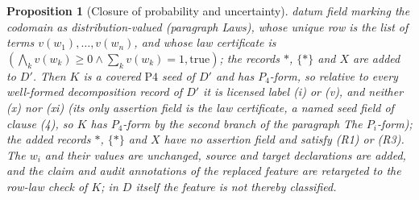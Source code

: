 \documentclass[11pt]{article}
\newtheorem{proposition}[theorem]{Proposition}
\theoremstyle{definition}
\newcommand{\Pfour}{\ensuremath{\mathrm{P4}}}
\begin{document}
\begin{proposition}[Closure of probability and uncertainty]
datum field marking the codomain as distribution-valued (paragraph
\emph{Laws}), whose unique row is the list of terms
\(v(w_1),\dots,v(w_n)\), and whose law certificate is
\((\bigwedge_k v(w_k)\ge0\wedge\sum_k v(w_k)=1,\mathrm{true})\); the records
\(*\), \(\{*\}\) and \(X\) are added to \(D'\).
Then \(K\) is a covered \Pfour{} seed of \(D'\) and has \(P_4\)-form, so
relative to every well-formed decomposition record of \(D'\) it is licensed
label (i) or (v), and neither (x) nor (xi) (its only assertion field is the
law certificate, a named seed field of clause (4), so \(K\) has \(P_4\)-form by
the second branch of the paragraph \emph{The \(P_i\)-form}); the added records \(*\),
\(\{*\}\) and \(X\) have no assertion field and satisfy (R1) or (R3). The \(w_i\) and their values are
unchanged, source and target declarations are added, and the claim and audit
annotations of the replaced feature are retargeted to the row-law check of
\(K\); in \(D\) itself the feature is not thereby classified.
\end{proposition}
\end{document}
